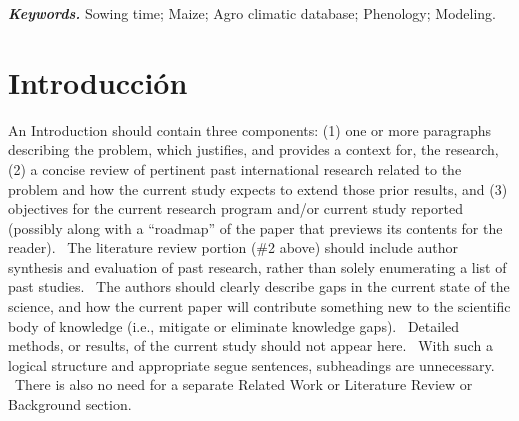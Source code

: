 \documentclass[10pt,authoryear]{elsarticle}
\begin{document}
{{			
		}
		
		
		\bigskip
		
		{\color{black}
			\textbf{\textit{Keywords.}} Sowing time; Maize; Agro climatic database; Phenology; Modeling.}
		
		\fi 
		\bigskip
		
		\section{Introducción}
		
		
		
		\iffalse
		{\color{black}
			An Introduction should contain three components: (1) one or more paragraphs describing the problem, which justifies, and provides a context for, the research, (2) a concise review of pertinent past international research related to the problem and how the current study expects to extend those prior results, and (3) objectives for the current research program and/or current study reported (possibly along with a “roadmap” of the paper that previews its contents for the reader). \ The literature review portion (\#2 above) should include author synthesis and evaluation of past research, rather than solely enumerating a list of past studies. \ The authors should clearly describe gaps in the current state of the science, and how the current paper will contribute something new to the scientific body of knowledge (i.e., mitigate or eliminate knowledge gaps). \ Detailed methods, or results, of the current study should not appear here. \ With such a logical structure and appropriate segue sentences, subheadings are unnecessary. \ There is also no need for a separate Related Work or Literature Review or Background section. }
		
}
\end{document}
